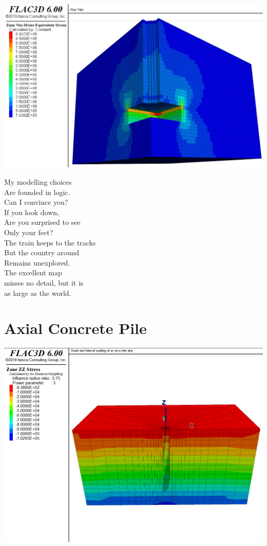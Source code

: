 \documentclass[a4paper, nobind]{templates/ociamthesis}
\begin{document}
\includegraphics[width=1\linewidth]{myfigureeeeee/result2}

\newpage

\begin{savequote}
My modelling choices\\
Are founded in logic.\\
Can I convince you?\\
If you look down,\\
Are you surprised to see\\
Only your feet?\\
The train keeps to the tracks\\
But the country around\\
Remains unexplored.\\
The excellent map\\
misses no detail, but it is\\
as large as the world.
\end{savequote}

\hypertarget{axial-concrete-pile}{%
\chapter{Axial Concrete Pile}\label{axial-concrete-pile}}

\includegraphics[width=1\linewidth]{myfigureeeeee/h}
\end{document}
